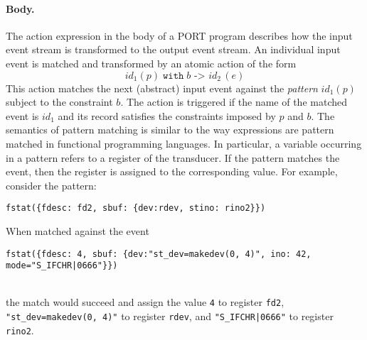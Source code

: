 %
%



\paragraph*{Body.}
The action expression in the body of a PORT program describes how the input event stream is transformed to the output event stream. An individual input event is matched and transformed by an atomic action of the form
\[\mathit{id}_1(p) \;\mathtt{with}\; b \texttt{ -> } \mathit{id}_2\,(e)\]
This action matches the next (abstract) input event against the \emph{pattern} $\mathit{id}_1(p)$ subject to the constraint $b$. The action is triggered if the name of the matched event is $\mathit{id}_1$ and its record satisfies the constraints imposed by $p$ and $b$. The semantics of pattern matching is similar to the way expressions are pattern matched in functional programming languages. In particular, a variable occurring in a pattern refers to a register of the transducer. If the pattern matches the event, then the register is assigned to the corresponding value. For example, consider the pattern:
\begin{lstlisting}[numbers=none,xleftmargin=0em,gobble=2]
  fstat({fdesc: fd2, sbuf: {dev:rdev, stino: rino2}})
\end{lstlisting}
When matched against the event\\[.3em]
\begin{adjustbox}{max width=\textwidth}
\begin{lstlisting}[numbers=none,xleftmargin=0em,gobble=2]
  fstat({fdesc: 4, sbuf: {dev:"st_dev=makedev(0, 4)", ino: 42, mode="S_IFCHR|0666"}})
\end{lstlisting}
\end{adjustbox}\\[.5em]
the match would succeed and assign the value \lstinline+4+ to register \lstinline+fd2+, \lstinline+"st_dev=makedev(0, 4)"+ to register \lstinline+rdev+, and \lstinline+"S_IFCHR|0666"+ to register \lstinline+rino2+.

